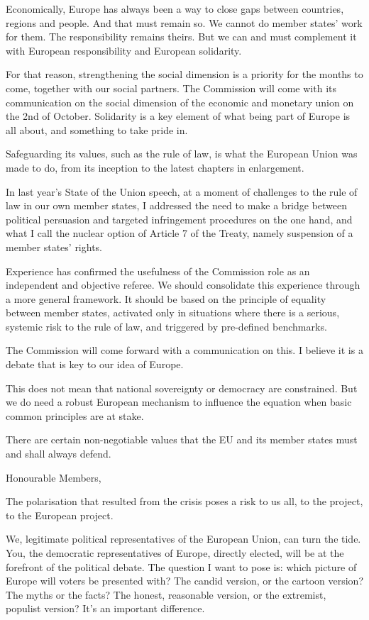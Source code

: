 \documentclass[a4paper,11pt]{article}
\begin{document}
Economically, Europe has always been a way to close gaps between countries, regions and people. And that must remain so. We cannot do member states' work for them. The responsibility remains theirs. But we can and must complement it with European responsibility and European solidarity.

For that reason, strengthening the social dimension is a priority for the months to come, together with our social partners. The Commission will come with its communication on the social dimension of the economic and monetary union on the 2nd of October. Solidarity is a key element of what being part of Europe is all about, and something to take pride in.

Safeguarding its values, such as the rule of law, is what the European Union was made to do, from its inception to the latest chapters in enlargement.

In last year's State of the Union speech, at a moment of challenges to the rule of law in our own member states, I addressed the need to make a bridge between political persuasion and targeted infringement procedures on the one hand, and what I call the nuclear option of Article 7 of the Treaty, namely suspension of a member states' rights.

Experience has confirmed the usefulness of the Commission role as an independent and objective referee. We should consolidate this experience through a more general framework. It should be based on the principle of equality between member states, activated only in situations where there is a serious, systemic risk to the rule of law, and triggered by pre-defined benchmarks.

The Commission will come forward with a communication on this. I believe it is a debate that is key to our idea of Europe.

This does not mean that national sovereignty or democracy are constrained. But we do need a robust European mechanism to influence the equation when basic common principles are at stake.

There are certain non-negotiable values that the EU and its member states must and shall always defend.

Honourable Members,

The polarisation that resulted from the crisis poses a risk to us all, to the project, to the European project.

We, legitimate political representatives of the European Union, can turn the tide. You, the democratic representatives of Europe, directly elected, will be at the forefront of the political debate. The question I want to pose is: which picture of Europe will voters be presented with? The candid version, or the cartoon version? The myths or the facts? The honest, reasonable version, or the extremist, populist version? It's an important difference.
\end{document}
